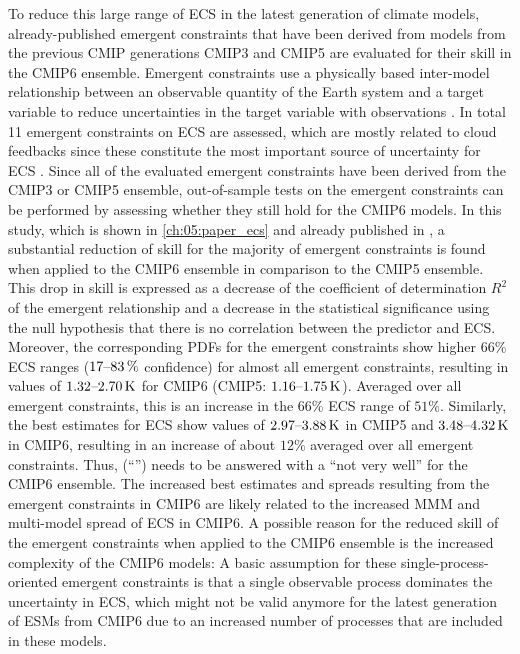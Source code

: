 To reduce this large range of \ac{ECS} in the latest generation of climate
models, already-published emergent constraints that have been derived from
models from the previous \ac{CMIP} generations \acs{CMIP}3 and \acs{CMIP}5 are
evaluated for their skill in the \acs{CMIP}6 ensemble. Emergent constraints use
a physically based inter-model relationship between an observable quantity of
the Earth system and a target variable to reduce uncertainties in the target
variable with observations \autocite{Allen2002}. In total 11 emergent
constraints on \ac{ECS} are assessed, which are mostly related to cloud
feedbacks since these constitute the most important source of uncertainty for
\ac{ECS} \autocite{Boucher2013, Flato2013}. Since all of the evaluated emergent
constraints have been derived from the \acs{CMIP}3 or \acs{CMIP}5 ensemble,
out-of-sample tests on the emergent constraints can be performed by assessing
whether they still hold for the \acs{CMIP}6 models. In this study, which is
shown in \cref{ch:05:paper_ecs} and already published in
\textcite{Schlund2020a}, a substantial reduction of skill for the majority of
emergent constraints is found when applied to the \acs{CMIP}6 ensemble in
comparison to the \acs{CMIP}5 ensemble. This drop in skill is expressed as a
decrease of the coefficient of determination $R^2$ of the emergent relationship
and a decrease in the statistical significance using the null hypothesis that
there is no correlation between the predictor and \ac{ECS}. Moreover, the
corresponding \acp{PDF} for the emergent constraints show higher $66 \unit{\%}$
\ac{ECS} ranges ($\rangeunit{17}{83}{\%}$ confidence) for almost all emergent
constraints, resulting in values of $\rangeunit{1.32}{2.70}{K}$ for \acs{CMIP}6
(\acs{CMIP}5: $\rangeunit{1.16}{1.75}{K}$). Averaged over all emergent
constraints, this is an increase in the $66 \unit{\%}$ \ac{ECS} range of $51
\unit{\%}$. Similarly, the best estimates for \ac{ECS} show values of
$\rangeunit{2.97}{3.88}{K}$ in \acs{CMIP}5 and $\rangeunit{3.48}{4.32}{K}$ in
\acs{CMIP}6, resulting in an increase of about $12 \unit{\%}$ averaged over all
emergent constraints. Thus, 
(\enquote{\KeyScienceQuestionTwo{}}) needs to be answered with a \enquote{not
  very well} for the \acs{CMIP}6 ensemble. The increased best estimates and
spreads resulting from the emergent constraints in \acs{CMIP}6 are likely
related to the increased \ac{MMM} and multi-model spread of \ac{ECS} in
\acs{CMIP}6. A possible reason for the reduced skill of the emergent
constraints when applied to the \acs{CMIP}6 ensemble is the increased
complexity of the \acs{CMIP}6 models: A basic assumption for these
single-process-oriented emergent constraints is that a single observable
process dominates the uncertainty in \ac{ECS}, which might not be valid anymore
for the latest generation of \acp{ESM} from \acs{CMIP}6 due to an increased
number of processes that are included in these models.

